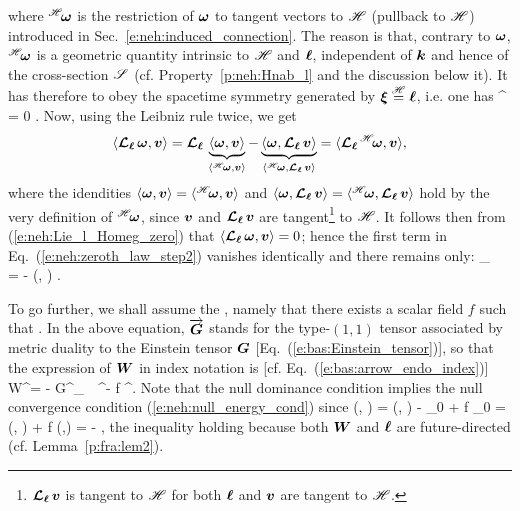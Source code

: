 where ${}^{\mathscr{H}}\!\bm{\omega}$ is the restriction of $\bm{\omega}$ to tangent vectors
to $\mathscr{H}$ (pullback to $\mathscr{H}$) introduced in Sec.~\ref{e:neh:induced_connection}.
The reason is that, contrary to $\bm{\omega}$,
${}^{\mathscr{H}}\!\bm{\omega}$ is a geometric quantity intrinsic to
$\mathscr{H}$ and $\bm{\ell}$, independent of $\bm{k}$ and hence of the cross-section $\mathscr{S}$
(cf. Property~\ref{p:neh:Hnab_l} and the discussion below it).
It has therefore to obey the spacetime symmetry generated by $\bm{\xi} \stackrel{\mathscr{H}}{=} \bm{\ell}$,
i.e. one has
\be \label{e:neh:Lie_l_Homeg_zero}
    \Lie{\el} {}^{\Hor}\!\w{\omega} = 0 .
\ee
Now, using the Leibniz rule twice, we get
\[
    \langle \bm{\mathcal{L}}_{\bm{\ell}}\, \bm{\omega}, \bm{v} \rangle = \bm{\mathcal{L}}_{\bm{\ell}}\,
    \underbrace{\langle \bm{\omega}, \bm{v} \rangle}_{\langle {}^{\mathscr{H}}\!\bm{\omega}, \bm{v} \rangle}
    - \underbrace{\langle \bm{\omega}, \bm{\mathcal{L}}_{\bm{\ell}}\, \bm{v} \rangle}_{\langle {}^{\mathscr{H}}\!\bm{\omega}, \bm{\mathcal{L}}_{\bm{\ell}}\, \bm{v} \rangle} = \langle \bm{\mathcal{L}}_{\bm{\ell}}\, {}^{\mathscr{H}}\!\bm{\omega}, \bm{v} \rangle ,
\]
where the idendities $\langle \bm{\omega}, \bm{v} \rangle = \langle {}^{\mathscr{H}}\!\bm{\omega}, \bm{v} \rangle$
and $\langle \bm{\omega}, \bm{\mathcal{L}}_{\bm{\ell}}\, \bm{v} \rangle =  \langle {}^{\mathscr{H}}\!\bm{\omega}, \bm{\mathcal{L}}_{\bm{\ell}}\, \bm{v} \rangle$
hold by the very definition of ${}^{\mathscr{H}}\!\bm{\omega}$,
since $\bm{v}$ and $\bm{\mathcal{L}}_{\bm{\ell}}\,\bm{v}$ are tangent\footnote{$\bm{\mathcal{L}}_{\bm{\ell}}\,\bm{v}$ is tangent to
$\mathscr{H}$ for both $\bm{\ell}$ and $\bm{v}$ are tangent to $\mathscr{H}$.}
to $\mathscr{H}$. It follows then from (\ref{e:neh:Lie_l_Homeg_zero}) that $\langle \bm{\mathcal{L}}_{\bm{\ell}}\, \bm{\omega}, \bm{v} \rangle = 0$; hence the
first term in Eq.~(\ref{e:neh:zeroth_law_step2}) vanishes identically and there remains
only:
\be \label{e:neh:DS_kappa_W}
    \wnab_{} \, \kappa = - (\wl, ) .
\ee

To go further, we shall assume the
 \cite{Racz08}, namely that there
exists a scalar field $f$ such that
\be \label{e:neh:null_dominant_cond}
   .
\ee
In the above equation, $\overrightarrow{\bm{G}}$ stands for the type-$(1,1)$ tensor
associated by metric duality to the Einstein tensor
$\bm{G}$ [Eq.~(\ref{e:bas:Einstein_tensor})], so that the expression of $\bm{W}$
in index notation is [cf. Eq.~(\ref{e:bas:arrow_endo_index})]
\be \label{e:neh:def_W_index}
    W^\alpha = - G^\alpha_{\ \, \mu} \el^\mu - f \ell^\alpha .
\ee
Note that the null dominance condition implies the null convergence condition
(\ref{e:neh:null_energy_cond}) since
\be \label{e:neh:R_ll_W_l}
    (\wl, \wl) = (\wl, \wl) -  _{0}
    + f _{0}  =  (\wl, \wl) + f (\wl,\wl)
     =  - \cdot\wl {} ,
\ee
the inequality holding because both $\bm{W}$ and $\bm{\ell}$ are future-directed
(cf. Lemma~\ref{p:fra:lem2}).

